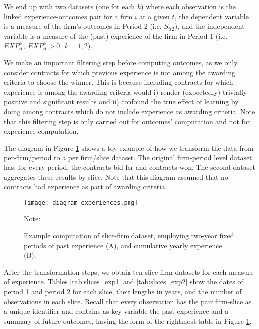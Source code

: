 We end up with two datasets (one for each $k$) where each observation is the linked experience-outcomes pair for a firm $i$ at a given $t$, the dependent variable is a measure of the firm’s outcomes in Period 2 (i.e. $S_{it2}$), and the independent variable is a measure of the (past) experience of the firm in Period 1 (i.e. $EXP^k_{it},\  EXP^k_{it}>0,\ k=1,2$).

We make an important filtering step before computing outcomes, as we only consider contracts for which previous experience is not among the awarding criteria to choose the winner. This is because including contracts for which experience is among the awarding criteria would i) render (expectedly) trivially positive and significant results and ii) confound the true effect of learning by doing among contracts which do not include experience as awarding criteria. Note that this filtering step is only carried out for outcomes' computation and not for experience computation.

The diagram in Figure \ref{fig:diagram_experience} shows a toy example of how we transform the data from per-firm/period to a per firm/slice dataset. The original firm-period level dataset has, for every period, the contracts bid for and contracts won. The second dataset aggregates these results by slice. Note that this diagram assumed that no contracts had experience as part of awarding criteria.

\begin{figure}
  \texttt{[image: diagram\_experiences.png]}
  \caption{Example computation of slice-firm dataset, employing two-year fixed periods of past experience (A), and cumulative yearly experience (B).}
  \label{fig:diagram_experience}
  \vskip 0.5mm
  { \footnotesize \underline{Note:} }
\end{figure}

After the transformation steps, we obtain ten slice-firm datasets for each measure of experience. Tables \ref{tab:slices_exp1} and \ref{tab:slices_exp2} show the dates of period 1 and period 2 for each slice, their lengths in years, and the number of observations in each slice. Recall that every observation has the pair firm-slice as a unique identifier and contains as key variable the past experience and a summary of future outcomes, having the form of the rightmost table in Figure \ref{fig:diagram_experience}.





